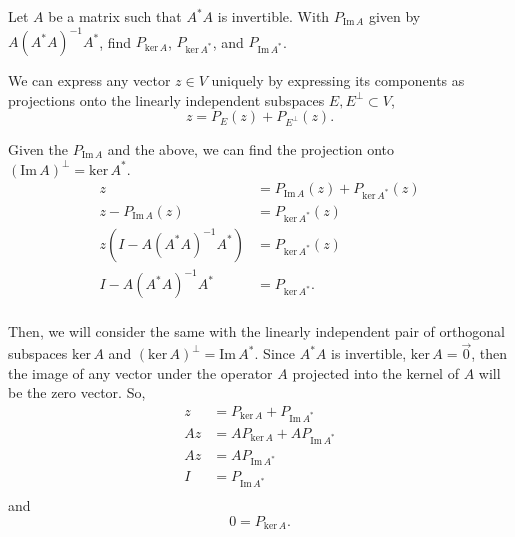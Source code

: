 \documentclass{article}
\begin{document}
  \begin{problem}
    Let $A$ be a matrix such that  $A^{*}A$ is invertible. 
    With $P_{\text{Im}\,A}$ given by $A{(A^{*}A)}^{-1}A^{*}$, find $P_{\text{ker}\,A}$, $P_{\text{ker}\,A^{*}}$, and $P_{\text{Im}\,A^{*}}$.
  \end{problem}

    We can express any vector $z\in V$ uniquely by expressing its components as projections onto the linearly independent subspaces $E,E^{\perp}\subset V$,
    \[
      z=P_E(z)+P_{E^{\perp}}(z)
    .\] 

    Given the $P_{\text{Im}\,A}$ and the above, we can find the projection onto ${\left( \text{Im}\,A \right)}^{\perp}=\text{ker}\,A^{*}$.
    \begin{align*}
      z&=P_{\text{Im}\,A}(z)+P_{\text{ker}\,A^{*}}(z)\\
      z-P_{\text{Im}\,A}(z)&= P_{\text{ker}\,A^{*}}(z) \\
      z(I-A{(A^{*}A)}^{-1}A^{*})&= P_{\text{ker}\,A^{*}}(z) \\
      I-A{(A^{*}A)}^{-1}A^{*}&= P_{\text{ker}\,A^{*}}. \\
    \end{align*}

    Then, we will consider the same with the linearly independent pair of orthogonal subspaces $\text{ker}\,A$ and ${(\text{ker}\,A)}^{\perp}=\text{Im}\,A^{*}$.
    Since $A^{*}A$ is invertible, $\text{ker}\,A={\vec{0}}$, then the image of any vector under the operator $A$ projected into the kernel of $A$ will be the zero vector.
    So,
    \begin{align*}
      z&= P_{\text{ker}\,A}+P_{\text{Im}\,A^{*}} \\
      Az&= AP_{\text{ker}\,A}+AP_{\text{Im}\,A^{*}}\\
      Az&= AP_{\text{Im}\,A^{*}}\\
      I &= P_{\text{Im}\,A^{*}} \\
    \end{align*}
    and
    \[
      0 = P_{\text{ker}\,A}
    .\] 
\end{document}
